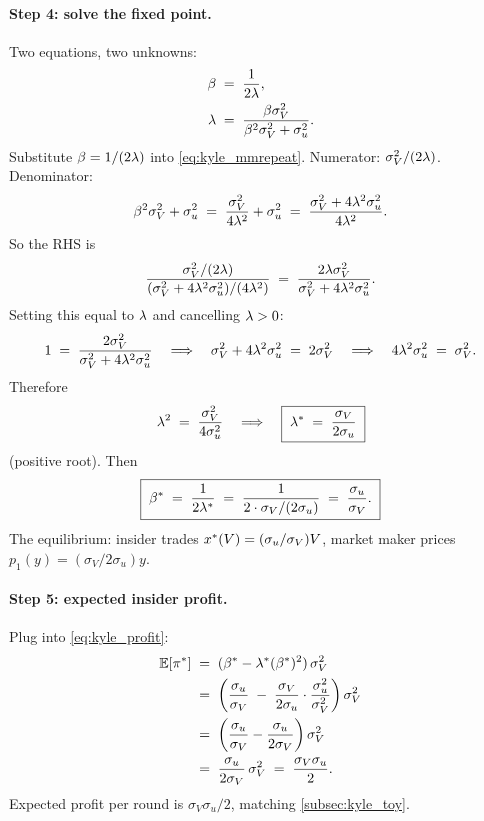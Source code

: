 \paragraph{Step 4: solve the fixed point.}
Two equations, two unknowns:
\begin{align}
  \beta \;&=\; \frac{1}{2\lambda}, \label{eq:kyle_foc} \\
  \lambda \;&=\; \frac{\beta \sigma_V^2}{\beta^2 \sigma_V^2 + \sigma_u^2}. \label{eq:kyle_mmrepeat}
\end{align}
Substitute $\beta = 1/(2\lambda)$ into \cref{eq:kyle_mmrepeat}.
Numerator: $\sigma_V^2/(2\lambda)$. Denominator:
\[
  \beta^2 \sigma_V^2 + \sigma_u^2
  \;=\; \frac{\sigma_V^2}{4\lambda^2} + \sigma_u^2
  \;=\; \frac{\sigma_V^2 + 4 \lambda^2 \sigma_u^2}{4\lambda^2}.
\]
So the RHS is
\[
  \frac{\sigma_V^2/(2\lambda)}{(\sigma_V^2 + 4\lambda^2\sigma_u^2)/(4\lambda^2)}
  \;=\; \frac{2\lambda \sigma_V^2}{\sigma_V^2 + 4\lambda^2 \sigma_u^2}.
\]
Setting this equal to $\lambda$ and cancelling $\lambda > 0$:
\[
  1 \;=\; \frac{2 \sigma_V^2}{\sigma_V^2 + 4\lambda^2 \sigma_u^2}
  \quad\Longrightarrow\quad
  \sigma_V^2 + 4\lambda^2 \sigma_u^2 \;=\; 2 \sigma_V^2
  \quad\Longrightarrow\quad
  4\lambda^2 \sigma_u^2 \;=\; \sigma_V^2.
\]
Therefore
\[
  \lambda^2 \;=\; \frac{\sigma_V^2}{4 \sigma_u^2}
  \quad\Longrightarrow\quad
  \boxed{\;\lambda^\ast \;=\; \frac{\sigma_V}{2\sigma_u}\;}
\]
(positive root). Then
\[
  \boxed{\;\beta^\ast \;=\; \frac{1}{2 \lambda^\ast}
  \;=\; \frac{1}{2 \cdot \sigma_V/(2\sigma_u)}
  \;=\; \frac{\sigma_u}{\sigma_V}.\;}
\]
The equilibrium: insider trades $x^\ast(V) =
(\sigma_u/\sigma_V)V$, market maker prices $p_1(y) = (\sigma_V /
2\sigma_u)y$.

\paragraph{Step 5: expected insider profit.}
Plug into \cref{eq:kyle_profit}:
\begin{align*}
  \mathbb{E}[\pi^\ast]
  \;&=\; (\beta^\ast - \lambda^\ast (\beta^\ast)^2)\,\sigma_V^2 \\
  \;&=\; \left(\frac{\sigma_u}{\sigma_V}
           \;-\; \frac{\sigma_V}{2\sigma_u}\cdot \frac{\sigma_u^2}{\sigma_V^2}\right)\sigma_V^2 \\
  \;&=\; \left(\frac{\sigma_u}{\sigma_V} - \frac{\sigma_u}{2\sigma_V}\right)\sigma_V^2 \\
  \;&=\; \frac{\sigma_u}{2\sigma_V}\,\sigma_V^2
  \;=\; \frac{\sigma_V \sigma_u}{2}.
\end{align*}
Expected profit per round is $\sigma_V \sigma_u / 2$, matching
\cref{subsec:kyle_toy}.

